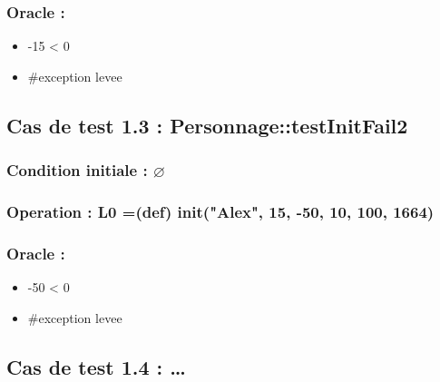 \documentclass[11pt]{article}
\begin{document}
\subsubsection{Oracle :}
\label{sec-1.2.3}

\begin{itemize}

\item -15 < 0\\
\label{sec-1.2.3.1}


\item \#exception levee\\
\label{sec-1.2.3.2}


\end{itemize} %
\subsection{Cas de test 1.3 : Personnage::testInitFail2}
\label{sec-1.3}

\subsubsection{Condition initiale : $\varnothing$}
\label{sec-1.3.1}

\subsubsection{Operation : L0 =(def) init("Alex", 15, -50, 10, 100, 1664)}
\label{sec-1.3.2}

\subsubsection{Oracle :}
\label{sec-1.3.3}

\begin{itemize}

\item -50 < 0\\
\label{sec-1.3.3.1}


\item \#exception levee\\
\label{sec-1.3.3.2}


\end{itemize} %
\subsection{Cas de test 1.4 : \ldots{}}
\label{sec-1.4}
\end{document}
